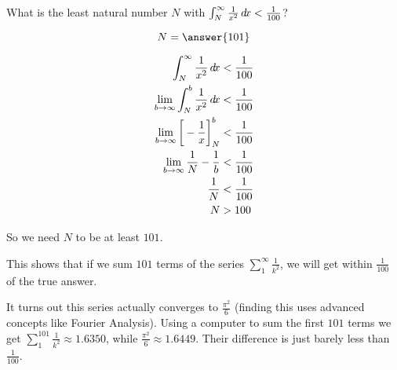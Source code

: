 \documentclass{ximera}
\begin{document}
\begin{question}
	What is the least natural number $N$ with $\int_N^\infty \frac{1}{x^2} \mathop{}\!d\! x < \frac{1}{100}$?
	
		\[
			N = \answer{101}
		\]
		
		\begin{hint}
			\begin{align*}
				\int_N^\infty \frac{1}{x^2} \mathop{}\!d\! x &< \frac{1}{100}\\
				\lim_{b \to \infty} \int_N^b \frac{1}{x^2} \mathop{}\!d\! x &< \frac{1}{100}\\
				\lim_{b \to \infty} \bigg[ -\frac{1}{x} \bigg]_N^b& < \frac{1}{100}\\
				\lim_{b \to \infty} \frac{1}{N} - \frac{1}{b}& < \frac{1}{100}\\
				\frac{1}{N} &< \frac{1}{100}\\
				N&>100
			\end{align*}
			
			
			So we need $N$ to be at least $101$.
		\end{hint}
\end{question}

This shows that if we sum $101$ terms of the series $\sum_1^\infty \frac{1}{k^2}$, we will get within $\frac{1}{100}$ of the true answer.

It turns out this series actually converges to $\frac{\pi^2}{6}$ (finding this uses advanced concepts like Fourier Analysis).  Using a computer to sum the first $101$ terms we get $\sum_1^101 \frac{1}{k^2} \approx 1.6350$, while $\frac{\pi^2}{6} \approx 1.6449 $.  Their difference is just barely less than $\frac{1}{100}$.
\end{document}
